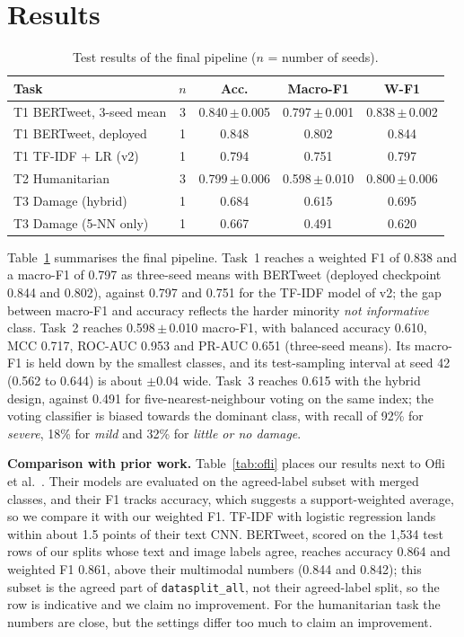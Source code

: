 \documentclass[conference]{IEEEtran}
\newcommand{\pmse}[2]{#1\,$\pm$\,#2}
\begin{document}
\section{Results}
\label{sec:results}

\begin{table}[t]
\centering
\caption{Test results of the final pipeline ($n$ = number of seeds).}
\label{tab:main}
\footnotesize
\setlength{\tabcolsep}{2.5pt}
\begin{tabular}{lcccc}
\toprule
Task & $n$ & Acc. & Macro-F1 & W-F1 \\
\midrule
T1 BERTweet, 3-seed mean & 3 & \pmse{0.840}{0.005} & \pmse{0.797}{0.001} & \pmse{0.838}{0.002} \\
T1 BERTweet, deployed & 1 & 0.848 & 0.802 & 0.844 \\
T1 TF-IDF + LR (v2) & 1 & 0.794 & 0.751 & 0.797 \\
T2 Humanitarian & 3 & \pmse{0.799}{0.006} & \pmse{0.598}{0.010} & \pmse{0.800}{0.006} \\
T3 Damage (hybrid) & 1 & 0.684 & 0.615 & 0.695 \\
T3 Damage (5-NN only) & 1 & 0.667 & 0.491 & 0.620 \\
\bottomrule
\end{tabular}
\end{table}

Table~\ref{tab:main} summarises the final pipeline. Task~1 reaches a weighted F1 of 0.838 and a macro-F1 of 0.797 as three-seed means with BERTweet (deployed checkpoint 0.844 and 0.802), against 0.797 and 0.751 for the TF-IDF model of v2; the gap between macro-F1 and accuracy reflects the harder minority \emph{not informative} class. Task~2 reaches \pmse{0.598}{0.010} macro-F1, with balanced accuracy 0.610, MCC 0.717, ROC-AUC 0.953 and PR-AUC 0.651 (three-seed means). Its macro-F1 is held down by the smallest classes, and its test-sampling interval at seed 42 (0.562 to 0.644) is about $\pm 0.04$ wide. Task~3 reaches 0.615 with the hybrid design, against 0.491 for five-nearest-neighbour voting on the same index; the voting classifier is biased towards the dominant class, with recall of 92\% for \emph{severe}, 18\% for \emph{mild} and 32\% for \emph{little or no damage}.

\textbf{Comparison with prior work.} Table~\ref{tab:ofli} places our results next to Ofli et al.~\cite{ofli2020}. Their models are evaluated on the agreed-label subset with merged classes, and their F1 tracks accuracy, which suggests a support-weighted average, so we compare it with our weighted F1. TF-IDF with logistic regression lands within about 1.5 points of their text CNN. BERTweet, scored on the 1,534 test rows of our splits whose text and image labels agree, reaches accuracy 0.864 and weighted F1 0.861, above their multimodal numbers (0.844 and 0.842); this subset is the agreed part of \texttt{datasplit\_all}, not their agreed-label split, so the row is indicative and we claim no improvement. For the humanitarian task the numbers are close, but the settings differ too much to claim an improvement.
\end{document}
